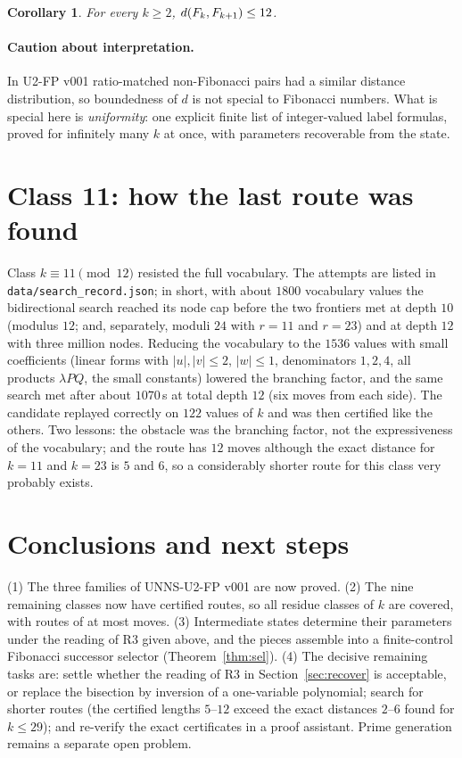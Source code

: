 \documentclass[11pt]{article}
\newtheorem{corollary}[theorem]{Corollary}
\theoremstyle{definition}
\theoremstyle{remark}
\begin{document}
\begin{corollary}\label{cor:bound}
For every $k\ge2$, $d(F_k,F_{k+1})\le12$.
\end{corollary}

\paragraph{Caution about interpretation.} In U2-FP v001 ratio-matched non-Fibonacci pairs had a similar distance distribution, so boundedness of $d$ is not special to Fibonacci numbers. What is special here is \emph{uniformity}: one explicit finite list of integer-valued label formulas, proved for infinitely many $k$ at once, with parameters recoverable from the state.

\section{Class 11: how the last route was found}\label{sec:open}
Class $k\equiv 11\pmod{12}$ resisted the full vocabulary. The attempts are listed in \texttt{data/search\_record.json}; in short, with about $1800$ vocabulary values the bidirectional search reached its node cap before the two frontiers met at depth $10$ (modulus $12$; and, separately, moduli $24$ with $r=11$ and $r=23$) and at depth $12$ with three million nodes. Reducing the vocabulary to the $1536$ values with small coefficients (linear forms with $|u|,|v|\le2$, $|w|\le1$, denominators $1,2,4$, all products $\lambda PQ$, the small constants) lowered the branching factor, and the same search met after about $1070$\,s at total depth $12$ (six moves from each side). The candidate replayed correctly on $122$ values of $k$ and was then certified like the others. Two lessons: the obstacle was the branching factor, not the expressiveness of the vocabulary; and the route has $12$ moves although the exact distance for $k=11$ and $k=23$ is $5$ and $6$, so a considerably shorter route for this class very probably exists.

\section{Conclusions and next steps}
(1) The three families of UNNS-U2-FP v001 are now proved. (2) The nine remaining classes now have certified routes, so all \NCov{} residue classes of $k$ are covered, with routes of at most \MaxLen{} moves. (3) Intermediate states determine their parameters under the reading of R3 given above, and the pieces assemble into a finite-control Fibonacci successor selector (Theorem~\ref{thm:sel}). (4) The decisive remaining tasks are: settle whether the reading of R3 in Section~\ref{sec:recover} is acceptable, or replace the bisection by inversion of a one-variable polynomial; search for shorter routes (the certified lengths $5$--$12$ exceed the exact distances $2$--$6$ found for $k\le29$); and re-verify the exact certificates in a proof assistant. Prime generation remains a separate open problem.
\end{document}
